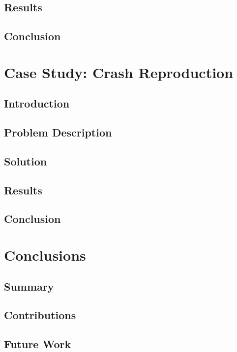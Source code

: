   \section{Results}
  \label{sec:results}
    \Blindtext
  \section{Conclusion}
  \label{sec:conclusion}
    \Blindtext

\chapter{Case Study: Crash Reproduction}
\label{chap:case_study_crash_reproduction}
  \section{Introduction}
  \label{sec:introduction}
    \Blindtext
  \section{Problem Description}
  \label{sec:problem_description}
    \Blindtext
  \section{Solution}
  \label{sec:solution}
    \Blindtext
  \section{Results}
  \label{sec:results}
    \Blindtext
  \section{Conclusion}
  \label{sec:conclusion}
    \Blindtext

\chapter{Conclusions}
\label{chap:conclusions}
  \section{Summary}
  \label{sec:summary}
    \Blindtext
  \section{Contributions}
  \label{sec:contributions}
    \Blindtext
  \section{Future Work}
  \label{sec:future_work}
    \Blindtext
